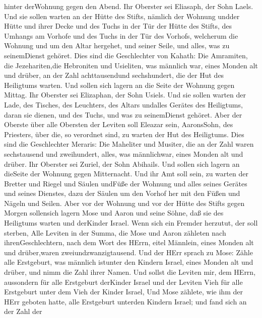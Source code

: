hinter derWohnung gegen den Abend.  Ihr Oberster sei
Eliasaph, der Sohn Laels.  Und sie sollen warten an der
Hütte des Stifts, nämlich der Wohnung undder Hütte und ihrer Decke und
des Tuchs in der Tür der Hütte des Stifts,  des Umhangs am
Vorhofe und des Tuchs in der Tür des Vorhofs, welcherum die Wohnung und
um den Altar hergehet, und seiner Seile, und alles, was zu seinemDienst
gehöret.  Dies sind die Geschlechter von Kahath: Die
Amramiten, die Jezehariten,die Hebroniten und Usieliten, 
was männlich war, eines Monden alt und drüber, an der Zahl
achttausendund sechshundert, die der Hut des Heiligtums warten.
 Und sollen sich lagern an die Seite der Wohnung gegen
Mittag.  Ihr Oberster sei Elizaphan, der Sohn Usiels.
 Und sie sollen warten der Lade, des Tisches, des
Leuchters, des Altars undalles Gerätes des Heiligtums, daran sie dienen,
und des Tuchs, und was zu seinemDienst gehöret.  Aber der
Oberste über alle Obersten der Leviten soll Eleazar sein, AaronsSohn,
des Priesters, über die, so verordnet sind, zu warten der Hut des
Heiligtums.  Dies sind die Geschlechter Meraris: Die
Maheliter und Musiter,  die an der Zahl waren sechstausend
und zweihundert, alles, was männlichwar, eines Monden alt und drüber.
 Ihr Oberster sei Zuriel, der Sohn Abihails. Und sollen
sich lagern an dieSeite der Wohnung gegen Mitternacht.  Und
ihr Amt soll sein, zu warten der Bretter und Riegel und Säulen undFüße
der Wohnung und alles seines Gerätes und seines Dienstes, 
dazu der Säulen um den Vorhof her mit den Füßen und Nägeln und Seilen.
 Aber vor der Wohnung und vor der Hütte des Stifts gegen
Morgen sollensich lagern Mose und Aaron und seine Söhne, daß sie des
Heiligtums warten und derKinder Israel. Wenn sich ein Fremder herzutut,
der soll sterben,  Alle Leviten in der Summa, die Mose und
Aaron zähleten nach ihrenGeschlechtern, nach dem Wort des HErrn, eitel
Männlein, eines Monden alt und drüber,waren zweiundzwanzigtausend.
 Und der HErr sprach zu Mose: Zähle alle Erstgeburt, was
männlich istunter den Kindern Israel, eines Monden alt und drüber, und
nimm die Zahl ihrer Namen.  Und sollst die Leviten mir, dem
HErrn, aussondern für alle Erstgeburt derKinder Israel und der Leviten
Vieh für alle Erstgeburt unter dem Vieh der Kinder Israel, 
Und Mose zählete, wie ihm der HErr geboten hatte, alle Erstgeburt
unterden Kindern Israel;  und fand sich an der Zahl der
